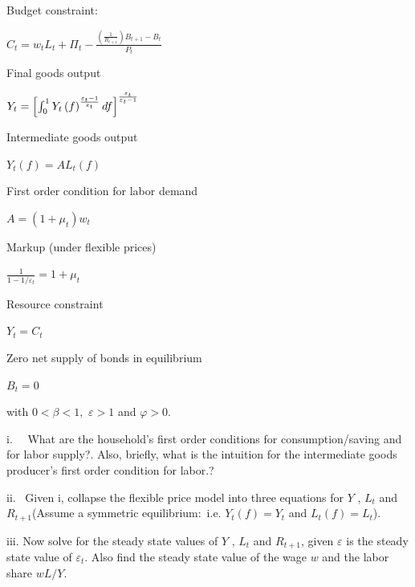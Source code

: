 \documentclass[11pt]{article}
\begin{document}
\qquad Budget constraint:

\begin{center}
$C_{t}=w_{t}L_{t}+\Pi _{t}-\frac{\left( \frac{1}{R_{t+1}}\right)
B_{t+1}-B_{t}}{P_{t}}$
\end{center}

\qquad Final goods output

\begin{center}
$Y_{t}=\left[ \int_{0}^{1}Y_{t}\left( f\right) ^{\frac{\varepsilon _{t}-1}{%
\varepsilon _{t}}}df\right] ^{\frac{\varepsilon _{t}}{\varepsilon _{t}-1}}$
\end{center}

\qquad Intermediate goods output

\begin{center}
$Y_{t}\left( f\right) =A L_{t}(f)$
\end{center}

\qquad First order condition for labor demand

\begin{center}
$A=(1+\mu _{t})w_{t}$
\end{center}

\qquad Markup (under flexible prices)

\begin{center}
$\frac{1}{1-1/\varepsilon _{t}}=1+\mu _{t}$
\end{center}

\qquad Resource constraint

\begin{center}
$Y_{t}=C_{t}$
\end{center}

\qquad Zero net supply of bonds in equilibrium

\begin{center}
$B_{t}=0$
\end{center}

with $0<\beta <1,$ $\varepsilon >1$ and $\varphi >0.$

i. \ \ What are the household's first order conditions for
consumption/saving and for labor supply?. Also, briefly, what is the
intuition for the intermediate goods producer's first order condition for
labor.?\bigskip

ii. \ Given i, collapse the flexible price model into three equations for $Y$
, $L_{t}$ and $R_{t+1}$(Assume a symmetric equilibrium:\ i.e. $Y_{t}\left(
f\right) =Y_{t}$ and $L_{t}(f)=L_{t}$)$.$\bigskip

iii. Now solve for the steady state values of $Y$ , $L_{t}$ and $R_{t+1}$,
given $\varepsilon $ is the steady state value of $\varepsilon _{t}.$ Also
find the steady state value of the wage $w$ and the labor share $wL/Y.$%
\bigskip
\end{document}
